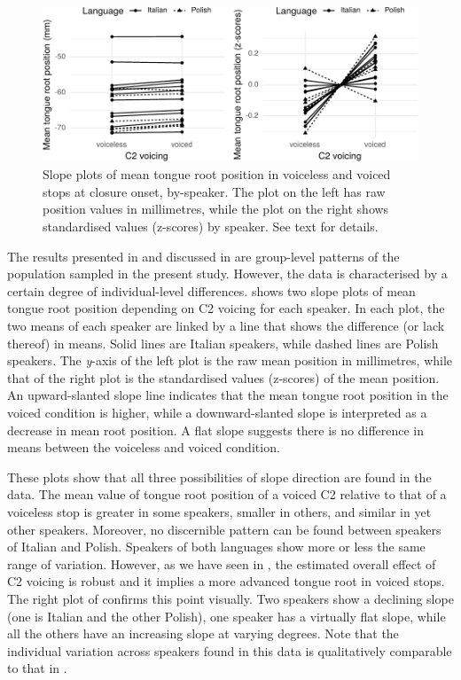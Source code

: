 \documentclass[preprint]{JASAnew}
\begin{document}
\label{s:idio}

\begin{figure}

{\centering \includegraphics[width=\linewidth]{./Figure8}

}

\caption{Slope plots of mean tongue root position in voiceless and voiced stops at closure onset, by-speaker. The plot on the left has raw position values in millimetres, while the plot on the right shows standardised values (z-scores) by speaker. See text for details.}\label{f:Figure8}
\end{figure}

The results presented in  and discussed in
 are group-level patterns of the population sampled
in the present study. However, the data is characterised by a certain
degree of individual-level differences.  shows two slope
plots of mean tongue root position depending on C2 voicing for each
speaker. In each plot, the two means of each speaker are linked by a
line that shows the difference (or lack thereof) in means. Solid lines
are Italian speakers, while dashed lines are Polish speakers. The
\emph{y}-axis of the left plot is the raw mean position in millimetres,
while that of the right plot is the standardised values (z-scores) of
the mean position. An upward-slanted slope line indicates that the mean
tongue root position in the voiced condition is higher, while a
downward-slanted slope is interpreted as a decrease in mean root
position. A flat slope suggests there is no difference in means between
the voiceless and voiced condition.

These plots show that all three possibilities of slope direction are
found in the data. The mean value of tongue root position of a voiced C2
relative to that of a voiceless stop is greater in some speakers,
smaller in others, and similar in yet other speakers. Moreover, no
discernible pattern can be found between speakers of Italian and Polish.
Speakers of both languages show more or less the same range of
variation. However, as we have seen in , the estimated
overall effect of C2 voicing is robust and it implies a more advanced
tongue root in voiced stops. The right plot of  confirms
this point visually. Two speakers show a declining slope (one is Italian
and the other Polish), one speaker has a virtually flat slope, while all
the others have an increasing slope at varying degrees. Note that the
individual variation across speakers found in this data is qualitatively
comparable to that in \citet{ahn2018}.
\end{document}
